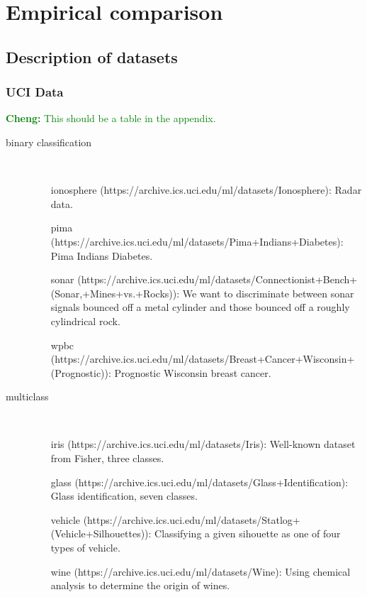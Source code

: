 \documentclass[fleqn,10pt,lineno]{wlpeerj} %
\newcommand{\cheng}[1]{\textcolor{green}{\textbf{Cheng: }{\footnotesize #1}}}
\begin{document}
\section*{Empirical comparison}

\subsection*{Description of datasets}

\subsubsection*{UCI Data}


\cheng{This should be a table in the appendix.}
\begin{description}
  \item[binary classification]\
  \begin{itemize}
      \item [ionosphere](https://archive.ics.uci.edu/ml/datasets/Ionosphere): Radar data.
      \item [pima](https://archive.ics.uci.edu/ml/datasets/Pima+Indians+Diabetes): Pima Indians Diabetes.
      \item [sonar](https://archive.ics.uci.edu/ml/datasets/Connectionist+Bench+(Sonar,+Mines+vs.+Rocks)): We want to discriminate between sonar signals bounced off a metal cylinder and those bounced off a roughly cylindrical rock.
      \item [wpbc](https://archive.ics.uci.edu/ml/datasets/Breast+Cancer+Wisconsin+(Prognostic)): Prognostic Wisconsin breast cancer.
  \end{itemize}
  \item[multiclass]\
  \begin{itemize}
    \item [iris](https://archive.ics.uci.edu/ml/datasets/Iris): Well-known dataset from Fisher, three classes.
    \item [glass](https://archive.ics.uci.edu/ml/datasets/Glass+Identification): Glass identification, seven classes.
    \item [vehicle](https://archive.ics.uci.edu/ml/datasets/Statlog+(Vehicle+Silhouettes)): Classifying a given sihouette as one of four types of vehicle.
    \item [wine](https://archive.ics.uci.edu/ml/datasets/Wine): Using chemical analysis to determine the origin of wines.
  \end{itemize}
\end{description}
\end{document}
